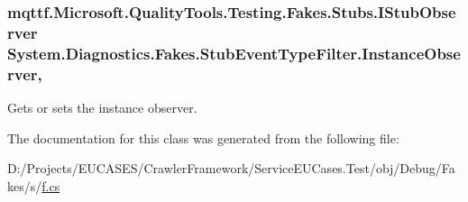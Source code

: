 \hypertarget{class_system_1_1_diagnostics_1_1_fakes_1_1_stub_event_type_filter_a8ba88853c3c40a24a66c03f956822de7}{
\subsubsection[{Instance\-Observer}]{\setlength{\rightskip}{0pt plus 5cm}mqttf.\-Microsoft.\-Quality\-Tools.\-Testing.\-Fakes.\-Stubs.\-I\-Stub\-Observer System.\-Diagnostics.\-Fakes.\-Stub\-Event\-Type\-Filter.\-Instance\-Observer\hspace{0.3cm}{\ttfamily [get]}, {\ttfamily [set]}}}\label{class_system_1_1_diagnostics_1_1_fakes_1_1_stub_event_type_filter_a8ba88853c3c40a24a66c03f956822de7}


Gets or sets the instance observer.



The documentation for this class was generated from the following file\-:\begin{DoxyCompactItemize}
\item 
D\-:/\-Projects/\-E\-U\-C\-A\-S\-E\-S/\-Crawler\-Framework/\-Service\-E\-U\-Cases.\-Test/obj/\-Debug/\-Fakes/s/\hyperlink{s_2f_8cs}{f.\-cs}\end{DoxyCompactItemize}
